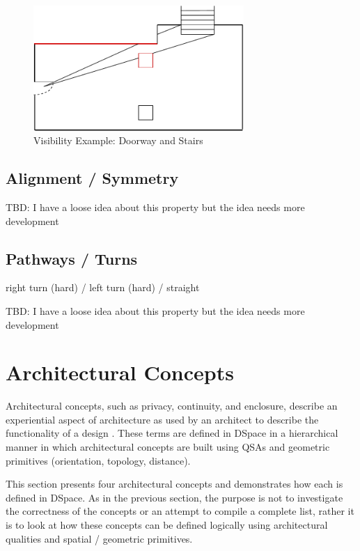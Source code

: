 \documentclass[12pt]{ucthesis}
\begin{document}
\begin{figure}[H]
\centering
\includegraphics[width=80mm]{visibility-stair-door}
\caption{Visibility Example: Doorway and Stairs}
\label{visibility-door-stair}
\end{figure}

\subsection{Alignment / Symmetry}

TBD: I have a loose idea about this property but the idea needs more development

\subsection{Pathways / Turns}  right turn (hard) / left turn (hard) / straight 

TBD: I have a loose idea about this property but the idea needs more development

\section{Architectural Concepts}
Architectural concepts, such as privacy, continuity, and enclosure, describe an experiential aspect of architecture as used by an architect to describe the functionality of a design \cite{Koile}. These terms are defined in DSpace in a hierarchical manner in which architectural concepts are built using QSAs and geometric primitives (orientation, topology, distance). 

This section presents four architectural concepts and demonstrates how each is defined in DSpace. As in the previous section, the purpose is not to investigate the correctness of the concepts or an attempt to compile a complete list, rather it is to look at how these concepts can be defined logically using architectural qualities and spatial / geometric primitives.
\end{document}
